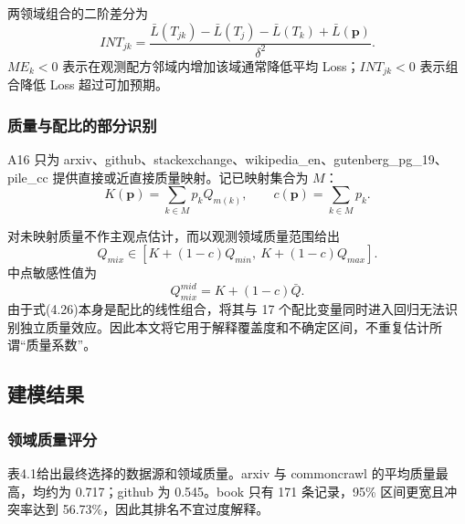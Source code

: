 \documentclass[bwprint]{gmcmthesis}
\begin{document}
        两领域组合的二阶差分为
        \begin{equation}
        INT_{jk}=\frac{
        \bar L(T_{jk})-\bar L(T_j)-\bar L(T_k)+\bar L(\bm p)
        }{\delta^2}.
        \label{eq:interaction}
        \end{equation}
        $ME_k<0$ 表示在观测配方邻域内增加该域通常降低平均 Loss；$INT_{jk}<0$ 表示组合降低 Loss 超过可加预期。

        
        \subsubsection{质量与配比的部分识别}  %
        A16 只为 arxiv、github、stackexchange、wikipedia\_en、gutenberg\_pg\_19、pile\_cc 提供直接或近直接质量映射。记已映射集合为 $M$：
        \begin{equation}
        K(\bm p)=\sum_{k\in M}p_kQ_{m(k)},\qquad
        c(\bm p)=\sum_{k\in M}p_k.
        \label{eq:mapped}
        \end{equation}
        
        对未映射质量不作主观点估计，而以观测领域质量范围给出
        \begin{equation}
        Q_{mix}\in\left[K+(1-c)Q_{min},\ K+(1-c)Q_{max}\right].
        \label{eq:partial}
        \end{equation}
        中点敏感性值为
        \begin{equation}
        Q_{mix}^{mid}=K+(1-c)\bar Q.
        \label{eq:qmid}
        \end{equation}
        由于式(4.26)本身是配比的线性组合，将其与 17 个配比变量同时进入回归无法识别独立质量效应。因此本文将它用于解释覆盖度和不确定区间，不重复估计所谓``质量系数''。


    \subsection{建模结果}   %
        \subsubsection{领域质量评分} %
        表4.1给出最终选择的数据源和领域质量。arxiv 与 commoncrawl 的平均质量最高，均约为 0.717；github 为 0.545。book 只有 171 条记录，95\% 区间更宽且冲突率达到 56.73\%，因此其排名不宜过度解释。
    
\end{document}
